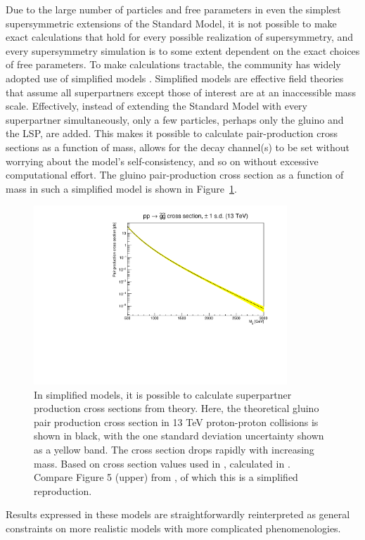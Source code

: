   Due to the large number of particles and free parameters in even the simplest supersymmetric extensions of the Standard Model, it is not possible to make exact calculations that hold for every possible realization of supersymmetry, and every supersymmetry simulation is to some extent dependent on the exact choices of free parameters.
  To make calculations tractable, the community has widely adopted use of simplified models \cite{SMS}.
  Simplified models are effective field theories that assume all superpartners except those of interest are at an inaccessible mass scale.
  Effectively, instead of extending the Standard Model with every superpartner simultaneously, only a few particles, perhaps only the gluino and the LSP, are added.
  This makes it possible to calculate pair-production cross sections as a function of mass, allows for the decay channel(s) to be set without worrying about the model's self-consistency, and so on without excessive computational effort.
  The gluino pair-production cross section as a function of mass in such a simplified model is shown in Figure~\ref{fig:SUSYxsec}.
  \begin{figure}[h!]
    \centering
    \includegraphics[width=0.85\textwidth]{figures/gluino_xsec.pdf}
    \caption[Theoretical gluino pair production cross section in simplified models.]{In simplified models, it is possible to calculate superpartner production cross sections from theory.
Here, the theoretical gluino pair production cross section in 13 TeV proton-proton collisions is shown in black, with the one standard deviation uncertainty shown as a yellow band.
The cross section drops rapidly with increasing mass.
Based on cross section values used in \cite{MT2_2019}, calculated in \cite{SUSYxsecs}.
Compare Figure 5 (upper) from \cite{SUSYxsecs}, of which this is a simplified reproduction.
}
    \label{fig:SUSYxsec}
  \end{figure}  
  Results expressed in these models are straightforwardly reinterpreted as general constraints on more realistic models with more complicated phenomenologies.

